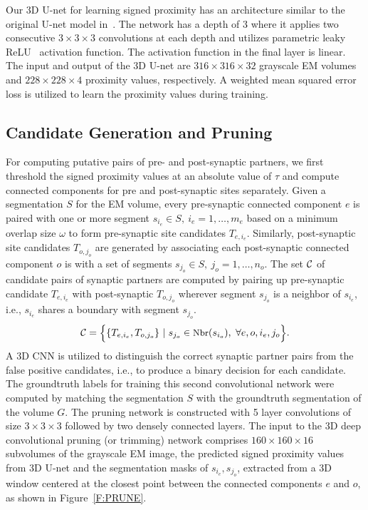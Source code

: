 \documentclass{llncs}
\begin{document}
Our 3D U-net for learning signed proximity has an architecture similar to the original U-net model in~\cite{ronneberger15unet}. The network has a depth of 3 where it applies two consecutive $3 \times 3 \times 3$ convolutions at each depth and utilizes parametric leaky ReLU~\cite{he15prelu} activation function. The activation function in the final layer is linear. The input and output of the 3D U-net are $316\times 316\times 32$ grayscale EM volumes and $228\times 228\times 4$ proximity values, respectively. A weighted mean squared error loss is utilized to learn the proximity values during training.

\subsection{Candidate Generation and Pruning}\label{S:CANDIDATE_PRUNE}
For computing putative pairs of pre- and post-synaptic partners, we first threshold the signed proximity values at an absolute value of $\tau$ and compute connected components for pre and post-synaptic sites separately. Given a segmentation $S$ for the EM volume, every pre-synaptic connected component $e$ is paired with one or more segment $s_{i_e} \in S,~ i_e = 1, \dots, m_e $ based on a minimum overlap size $\omega$ to form pre-synaptic site candidates $T_{e,{i_e}}$. Similarly, post-synaptic site candidates $T_{o,{j_o}}$ are generated by associating each post-synaptic connected component $o$ is with a set of segments $ s_{j_o} \in S,~ j_o = 1, \dots, n_o$. The set $\cal C$ of candidate pairs of synaptic partners are computed by pairing up pre-synaptic candidate $T_{e,{i_e}}$  with post-synaptic $T_{o,{j_o}}$ wherever segment $s_{j_o}$ is a neighbor of $s_{i_e}$, i.e., $s_{i_e}$ shares a boundary with segment $s_{j_o}$.
\vspace{-0.2cm}
\begin{equation}
\small {\cal C} = \Bigl \{ \{ T_{e,{i_e}}, T_{o,{j_o}} \}~|~ s_{j_o} \in \text{Nbr}(s_{i_o}), ~\forall {e, o, i_e, j_o} \Bigr \}. 
\vspace{-0.2cm}
\end{equation}
A 3D CNN is utilized to distinguish  the correct synaptic partner pairs from the false positive candidates, i.e., to produce a binary decision for each candidate. The groundtruth labels for training this second convolutional network were computed by matching the segmentation $S$ with the groundtruth segmentation of the volume $G$. The pruning network is constructed with 5 layer convolutions of size $3 \times 3 \times 3$ followed by two densely connected layers. The input to the 3D deep convolutional pruning (or trimming) network comprises $160\times 160\times 16$ subvolumes of  the grayscale EM image, the predicted signed proximity values from 3D U-net and the segmentation masks of $s_{i_e}, s_{j_o}$, extracted from a 3D window centered at the closest point between the connected components $e$ and $o$, as shown in Figure~\ref{F:PRUNE}. 
\end{document}
